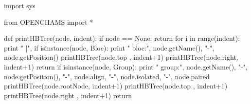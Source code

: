 \begin{DoxyCodeInclude}
\textcolor{keyword}{import} sys

\textcolor{keyword}{from} OPENCHAMS \textcolor{keyword}{import} *

\textcolor{keyword}{def }printHBTree(node, indent):
    \textcolor{keywordflow}{if} node == \textcolor{keywordtype}{None}:
        \textcolor{keywordflow}{return}
    \textcolor{keywordflow}{for} i \textcolor{keywordflow}{in} range(indent):
        \textcolor{keywordflow}{print} \textcolor{stringliteral}{" |"},
    \textcolor{keywordflow}{if} isinstance(node, Bloc):
        \textcolor{keywordflow}{print} \textcolor{stringliteral}{" bloc:"}, node.getName(), \textcolor{stringliteral}{"-"}, node.getPosition()
        printHBTree(node.top  , indent+1)
        printHBTree(node.right, indent+1)
        \textcolor{keywordflow}{return}
    \textcolor{keywordflow}{if} isinstance(node, Group):
        \textcolor{keywordflow}{print} \textcolor{stringliteral}{" group:"}, node.getName(), \textcolor{stringliteral}{"-"}, node.getPosition(), \textcolor{stringliteral}{"-"}, node.align, \textcolor{stringliteral}{"-"}, node.isolated, \textcolor{stringliteral}{"-"},
       node.paired
        printHBTree(node.rootNode, indent+1)
        printHBTree(node.top     , indent+1)
        printHBTree(node.right   , indent+1)
        \textcolor{keywordflow}{return}


\end{DoxyCodeInclude}
